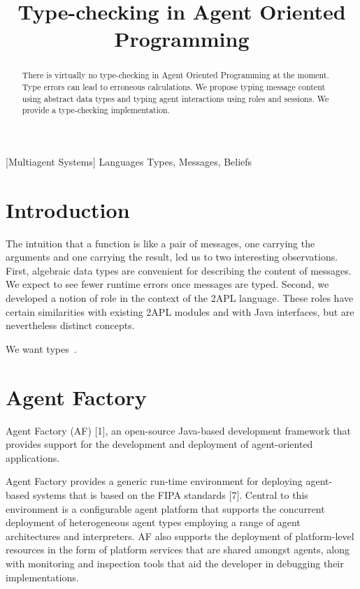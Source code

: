 \documentclass[preprint]{sigplanconf} %
\title{Type-checking in Agent Oriented Programming}
\begin{document}
\maketitle
\begin{abstract} %
There is virtually no type-checking in Agent Oriented Programming at the moment. Type errors can lead to erroneous calculations. We propose typing message content using abstract data types and typing agent interactions using roles and sessions. We provide a type-checking implementation.

\end{abstract} %
[Multiagent Systems]
\terms Languages
\keywords Types, Messages, Beliefs

\section{Introduction} %
The intuition that a function is like a pair of messages, one carrying the
arguments and one carrying the result, led us to two interesting
observations. First, algebraic data types are convenient for describing the
content of messages. We expect to see fewer runtime errors once messages
are typed. Second, we developed a notion of role in the context of the 2APL
language. These roles have certain similarities with existing 2APL modules
and with Java interfaces, but are nevertheless distinct concepts.

We want types~\cite{DBLP:conf/ctcs/Hagino87}.

\section{Agent Factory} %
Agent Factory (AF) [1], an open-source Java-based development framework that
provides support for the development and deployment of agent-oriented
applications.

Agent Factory provides a generic run-time environment for deploying agent-
based systems that is based on the FIPA standards [7]. Central to this
environment is a configurable agent platform that supports the concurrent
deployment of heterogeneous agent types employing a range of agent
architectures and interpreters. AF also supports the deployment of
platform-level resources in the form of platform services that are shared
amongst agents, along with monitoring and inspection tools that aid the
developer in debugging their implementations.
\end{document}
